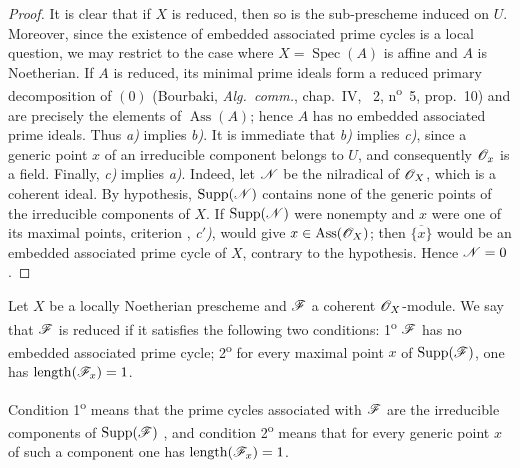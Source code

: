 \begin{proof}
It is clear that if $X$ is reduced, then so is the sub-prescheme induced on $U$.
Moreover, since the existence of embedded associated prime cycles is a local question, we may restrict to the case where $X=\operatorname{Spec}(A)$ is affine and $A$ is Noetherian.
If $A$ is reduced, its minimal prime ideals form a reduced primary decomposition of $(0)$ (Bourbaki, \emph{Alg.\ comm.}, chap.~IV, \textsection~2, n\textsuperscript{o}~5, prop.~10) and are precisely the elements of $\operatorname{Ass}(A)$; hence $A$ has no embedded associated prime ideals.  Thus \emph{a)} implies \emph{b)}.
It is immediate that \emph{b)} implies \emph{c)}, since a generic point $x$ of an irreducible component belongs to $U$, and consequently $\mathscr{O}_x$ is a field.
Finally, \emph{c)} implies \emph{a)}.  Indeed, let $\mathscr{N}$ be the nilradical of $\mathscr{O}_X$, which is a coherent ideal.  By hypothesis, $\operatorname{Supp}(\mathscr{N})$ contains none of the generic points of the irreducible components of $X$.  If $\operatorname{Supp}(\mathscr{N})$ were nonempty and $x$ were one of its maximal points, criterion , \emph{c$'$)}, would give $x\in\operatorname{Ass}(\mathscr{O}_X)$; then $\overline{\{x\}}$ would be an embedded associated prime cycle of $X$, contrary to the hypothesis.  Hence $\mathscr{N}=0$.
\end{proof}

\begin{definition}[3.2.2]
\label{IV.3.2.2}
Let $X$ be a locally Noetherian prescheme and $\mathscr{F}$ a coherent $\mathscr{O}_X$-module.
We say that $\mathscr{F}$ is reduced if it satisfies the following two conditions: 1\textsuperscript{o} $\mathscr{F}$ has no embedded associated prime cycle; 2\textsuperscript{o} for every maximal point $x$ of $\operatorname{Supp}(\mathscr{F})$, one has $\operatorname{length}(\mathscr{F}_x)=1$.
\end{definition}

Condition 1\textsuperscript{o} means that the prime cycles associated with $\mathscr{F}$ are the irreducible components of $\operatorname{Supp}(\mathscr{F})$ , and condition 2\textsuperscript{o} means that for every generic point $x$ of such a component one has $\operatorname{length}(\mathscr{F}_x)=1$.

